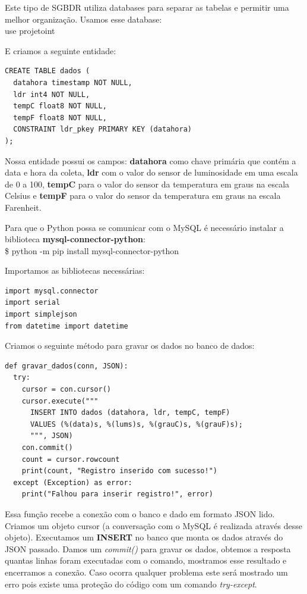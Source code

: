 \documentclass[a4paper,11pt]{article}
\begin{document}
Este tipo de SGBDR utiliza databases para separar as tabelas e permitir uma melhor organização. Usamos esse database: \\
{\ttfamily use projetoint}

E criamos a seguinte entidade:
\begin{lstlisting}[]
CREATE TABLE dados (
  datahora timestamp NOT NULL,
  ldr int4 NOT NULL,
  tempC float8 NOT NULL,
  tempF float8 NOT NULL,
  CONSTRAINT ldr_pkey PRIMARY KEY (datahora)
);
\end{lstlisting}

Nossa entidade possui os campos: \textbf{datahora} como chave primária que contém a data e hora da coleta, \textbf{ldr} com o valor do sensor de luminosidade em uma escala de 0 a 100, \textbf{tempC} para o valor do sensor da temperatura em graus na escala Celsius e \textbf{tempF} para o valor do sensor da temperatura em graus na escala Farenheit.

Para que o Python possa se comunicar com o MySQL é necessário instalar a biblioteca \textbf{mysql-connector-python}: \\
{\ttfamily\$ python -m pip install mysql-connector-python}

Importamos as bibliotecas necessárias:
\begin{lstlisting}[]
import mysql.connector
import serial
import simplejson
from datetime import datetime
\end{lstlisting}

Criamos o seguinte método para gravar os dados no banco de dados:
\begin{lstlisting}[]
def gravar_dados(conn, JSON):
  try:
    cursor = con.cursor()
    cursor.execute("""
      INSERT INTO dados (datahora, ldr, tempC, tempF)
      VALUES (%(data)s, %(lums)s, %(grauC)s, %(grauF)s);
      """, JSON)
    con.commit()
    count = cursor.rowcount
    print(count, "Registro inserido com sucesso!")
  except (Exception) as error:
    print("Falhou para inserir registro!", error)
\end{lstlisting}

Essa função recebe a conexão com o banco e dado em formato JSON lido. Criamos um objeto cursor (a conversação com o MySQL é realizada através desse objeto). Executamos um \textbf{INSERT} no banco que monta os dados através do JSON passado. Damos um \textit{commit()} para gravar os dados, obtemos a resposta quantas linhas foram executadas com o comando, mostramos esse resultado e encerramos a conexão. Caso ocorra qualquer problema este será mostrado um erro pois existe uma proteção do código com um comando \textit{try-except}.
\end{document}
